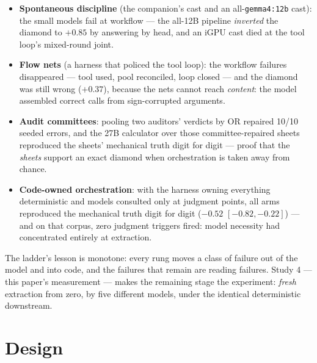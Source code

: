 \documentclass[11pt]{article}
\begin{document}
\begin{itemize}
  \item \textbf{Spontaneous discipline} (the companion's cast and an all-\texttt{gemma4:12b} cast): the small models fail at workflow --- the all-12B pipeline \emph{inverted} the diamond to $+0.85$ by answering by head, and an iGPU cast died at the tool loop's mixed-round joint.
  \item \textbf{Flow nets} (a harness that policed the tool loop): the workflow failures disappeared --- tool used, pool reconciled, loop closed --- and the diamond was still wrong ($+0.37$), because the nets cannot reach \emph{content}: the model assembled correct calls from sign-corrupted arguments.
  \item \textbf{Audit committees}: pooling two auditors' verdicts by OR repaired 10/10 seeded errors, and the 27B calculator over those committee-repaired sheets reproduced the sheets' mechanical truth digit for digit --- proof that the \emph{sheets} support an exact diamond when orchestration is taken away from chance.
  \item \textbf{Code-owned orchestration}: with the harness owning everything deterministic and models consulted only at judgment points, all arms reproduced the mechanical truth digit for digit ($-0.52$ $[-0.82, -0.22]$) --- and on that corpus, zero judgment triggers fired: model necessity had concentrated entirely at extraction.
\end{itemize}

The ladder's lesson is monotone: every rung moves a class of failure out of the model and into code, and the failures that remain are reading failures. Study 4 --- this paper's measurement --- makes the remaining stage the experiment: \emph{fresh} extraction from zero, by five different models, under the identical deterministic downstream.

\section{Design}
\end{document}
